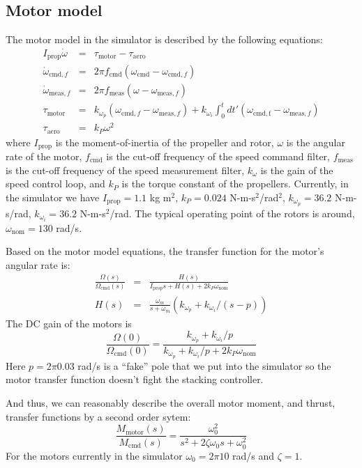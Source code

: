 \documentclass[11pt]{amsart}
\newcommand{\cmd}{\mathrm{cmd}}
\newcommand{\meas}{\mathrm{meas}}
\newcommand{\aero}{\mathrm{aero}}
\newcommand{\motor}{\mathrm{motor}}
\newcommand{\prop}{\mathrm{prop}}
\begin{document}
\subsection{Motor model}

The motor model in the simulator is described by the following
equations:
%
\begin{eqnarray}
I_{\prop} \dot \omega &=& \tau_{\motor} - \tau_{\aero} \\
\dot{\omega}_{\cmd,f} &=& 2 \pi f_{\cmd} (\omega_{\cmd} - \omega_{\cmd,f}) \\
\dot{\omega}_{\meas,f} &=& 2 \pi f_{\meas} (\omega - \omega_{\meas,f}) \\
\tau_{\motor} &=& k_{\omega}_p \left( \omega_{\cmd,f} - \omega_{\meas,f} \right) +
k_{\omega}_i \int_0^t dt' \left( \omega_{\mathrm{cmd,f}} - \omega_{\meas,f} \right) \\
\tau_{\mathrm{aero}} &=& k_P \omega^2
\end{eqnarray}
where $I_{\mathrm{prop}}$ is the moment-of-inertia of the propeller
and rotor, $\omega$ is the angular rate of the motor, $f_{\cmd}$ is
the cut-off frequency of the speed command filter, $f_{\meas}$ is the
cut-off frequency of the speed measurement filter, $k_{\omega}$ is the
gain of the speed control loop, and $k_P$ is the torque constant of
the propellers.  Currently, in the simulator we have
$I_{\mathrm{prop}} = 1.1$ kg m$^2$, $k_P = 0.024$ N-m-s$^2$/rad$^2$,
$k_{\omega}_p = 36.2$ N-m-s/rad, $k_{\omega}_i = 36.2$ N-m-s$^2$/rad.
The typical operating point of the rotors is around,
$\omega_{\mathrm{nom}} = 130$ rad/s.

Based on the motor model equations, the transfer function for the
motor's angular rate is:
\begin{eqnarray}
\frac{\Omega(s)}{\Omega_{\mathrm{cmd}}(s)}
&=& \frac{H(s)}{I_{\mathrm{prop}} s + H(s) + 2 k_P \omega_{\mathrm{nom}}} \\
H(s) &=& \frac{\omega_m}{s + \omega_m} (k_{\omega}_p + k_{\omega}_i / (s - p))
\end{eqnarray}
The DC gain of the motors is
\begin{equation}
\frac{\Omega(0)}{\Omega_{\mathrm{cmd}}(0)} =
\frac{k_{\omega}_p + k_{\omega}_i / p}
{k_{\omega}_p + k_{\omega}_i / p + 2 k_P \omega_{\mathrm{nom}}}
\end{equation}
Here $p = 2 \pi 0.03$ rad/s is a ``fake'' pole that we put into the
simulator so the motor transfer function doesn't fight the stacking
controller.

And thus, we can reasonably describe the overall motor moment, and
thrust, transfer functions by a second order sytem:
\begin{equation}
\frac{M_{\mathrm{motor}}(s)}{M_{\mathrm{cmd}}(s)} =
\frac{\omega_0^2}{s^2 + 2 \zeta \omega_0 s + \omega_0^2}
\end{equation}
For the motors currently in the simulator $\omega_0 = 2 \pi 10$ rad/s and
$\zeta = 1$.
\end{document}
